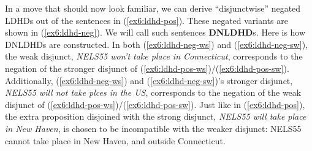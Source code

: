 \begin{exe}
	\label{ex6:ldhd-pos-sr}
\end{exe}


In a move that should now look familiar, we can derive ``disjunctwise'' negated LDHDs out of the sentences in (\ref{ex6:ldhd-pos}). These negated variants are shown in (\ref{ex6:ldhd-neg}). We will call such sentences \textbf{DNLDHD}s. Here is how DNLDHDs are constructed. In both (\ref{ex6:ldhd-neg-ws}) and (\ref{ex6:ldhd-neg-sw}), the weak disjunct, \textit{NELS55 won't take place in Connecticut}, corresponds to the negation of the stronger disjunct of (\ref{ex6:ldhd-pos-ws})/(\ref{ex6:ldhd-pos-sw}). Additionally, (\ref{ex6:ldhd-neg-ws}) and (\ref{ex6:ldhd-neg-sw})'s stronger disjunct, \textit{NELS55 will not take plces in the US}, corresponds to the negation of the weak disjunct of (\ref{ex6:ldhd-pos-ws})/(\ref{ex6:ldhd-pos-sw}). Just like in (\ref{ex6:ldhd-pos}), the extra proposition disjoined with the strong disjunct,  \textit{NELS55 will take place in New Haven}, is chosen to be incompatible with the weaker disjunct: NELS55 cannot take place in New Haven, and outside Connecticut.

